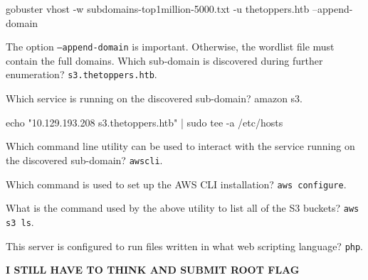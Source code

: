\documentclass[a4paper,10pt]{article}
\begin{document}
\begin{bash}
gobuster vhost -w subdomains-top1million-5000.txt -u thetoppers.htb --append-domain
\end{bash}
The option \texttt{--append-domain} is important. Otherwise, the wordlist file must contain the full domains.
Which sub-domain is discovered during further enumeration? \texttt{s3.thetoppers.htb}.

Which service is running on the discovered sub-domain? amazon s3.
\begin{bash}
echo "10.129.193.208    s3.thetoppers.htb" | sudo tee -a /etc/hosts
\end{bash}

Which command line utility can be used to interact with the service running on the discovered sub-domain? \texttt{awscli}.

Which command is used to set up the AWS CLI installation? \texttt{aws configure}.

What is the command used by the above utility to list all of the S3 buckets? \texttt{aws s3 ls}.

This server is configured to run files written in what web scripting language? \texttt{php}.

\n

\textbf{I STILL HAVE TO THINK AND SUBMIT ROOT FLAG}
\end{document}
